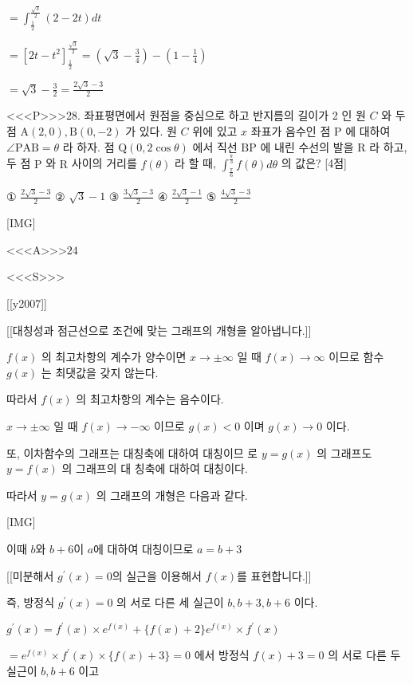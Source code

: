 \documentclass{oblivoir}
\begin{document}
$=\int_{\frac{1}{2}}^{\frac{\sqrt{3}}{2}}(2-2 t) d t$

$=\left[2 t-t^{2}\right]_{\frac{1}{2}}^{\frac{\sqrt{3}}{2}}=\left(\sqrt{3}-\frac{3}{4}\right)-\left(1-\frac{1}{4}\right)$

$=\sqrt{3}-\frac{3}{2}=\frac{2 \sqrt{3}-3}{2}$


<<<P>>>28. 좌표평면에서 원점을 중심으로 하고 반지름의 길이가 2 인 원 $C$ 와 두 점 $\mathrm{A}(2,0), \mathrm{B}(0,-2)$ 가 있다. 원 $C$ 위에 있고 $x$ 좌표가 음수인 점 $\mathrm{P}$ 에 대하여 $\angle \mathrm{PAB}=\theta$ 라 하자.
점 $\mathrm{Q}(0,2 \cos \theta)$ 에서 직선 $\mathrm{BP}$ 에 내린 수선의 발을 $\mathrm{R}$ 라 하고, 두 점 $\mathrm{P}$ 와 $\mathrm{R}$ 사이의 거리를 $f(\theta)$ 라 할 때, $\int_{\frac{\pi}{6}}^{\frac{\pi}{3}} f(\theta) d \theta$ 의 값은? [4점]

① $\frac{2 \sqrt{3}-3}{2}$
② $\sqrt{3}-1$
③ $\frac{3 \sqrt{3}-3}{2}$
④ $\frac{2 \sqrt{3}-1}{2}$
⑤ $\frac{4 \sqrt{3}-3}{2}$


[IMG]


<<<A>>>$24$

<<<S>>>

[[y2007]]

[[대칭성과 점근선으로 조건에 맞는 그래프의 개형을 알아냅니다.]]

$f(x)$ 의 최고차항의 계수가 양수이면 $x \rightarrow \pm \infty$ 일 때 $f(x) \rightarrow \infty$ 이므로 함수 $g(x)$ 는 최댓값을 갖지 않는다.

따라서 $f(x)$ 의 최고차항의 계수는 음수이다. 

$x \rightarrow \pm \infty$ 일 때 $f(x) \rightarrow-\infty$ 이므로 $g(x)<0$ 이며 $g(x) \rightarrow 0$ 이다.

또, 이차함수의 그래프는 대칭축에 대하여 대칭이므 로 $y=g(x)$ 의 그래프도 $y=f(x)$ 의 그래프의 대 칭축에 대하여 대칭이다.

따라서 $y=g(x)$ 의 그래프의 개형은 다음과 같다.

[IMG]

이때 $b$와 $b+6$이 $a$에 대하여 대칭이므로 $a=b+3$ 

[[미분해서 $g^{\prime}(x)=0$의 실근을 이용해서 $f(x)$를 표현합니다.]]

즉, 방정식 $g^{\prime}(x)=0$ 의 서로 다른 세 실근이 $b, b+3, b+6$ 이다.

$g^{\prime}(x)=f^{\prime}(x) \times e^{f(x)}+\{f(x)+2\} e^{f(x)} \times f^{\prime}(x)$

$=e^{f(x)} \times f^{\prime}(x) \times\{f(x)+3\}=0$ 에서 방정식 $f(x)+3=0$ 의 서로 다른 두 실근이 $b, b+6$ 이고
\end{document}
